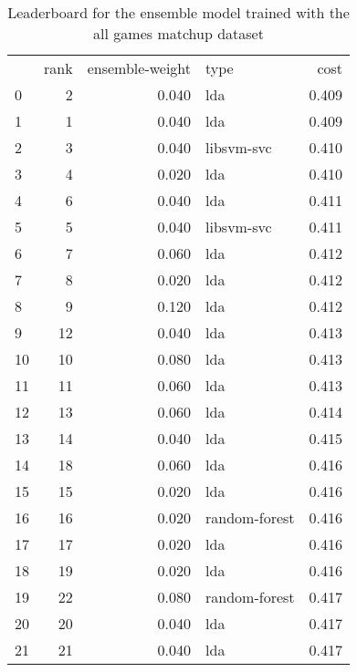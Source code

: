 \begin{table}[]
	\centering
	\begin{tabular}{lrrlr}
		   & rank & ensemble-weight & type          & cost  \\
		0  & 2    & 0.040           & lda           & 0.409 \\
		1  & 1    & 0.040           & lda           & 0.409 \\
		2  & 3    & 0.040           & libsvm-svc    & 0.410 \\
		3  & 4    & 0.020           & lda           & 0.410 \\
		4  & 6    & 0.040           & lda           & 0.411 \\
		5  & 5    & 0.040           & libsvm-svc    & 0.411 \\
		6  & 7    & 0.060           & lda           & 0.412 \\
		7  & 8    & 0.020           & lda           & 0.412 \\
		8  & 9    & 0.120           & lda           & 0.412 \\
		9  & 12   & 0.040           & lda           & 0.413 \\
		10 & 10   & 0.080           & lda           & 0.413 \\
		11 & 11   & 0.060           & lda           & 0.413 \\
		12 & 13   & 0.060           & lda           & 0.414 \\
		13 & 14   & 0.040           & lda           & 0.415 \\
		14 & 18   & 0.060           & lda           & 0.416 \\
		15 & 15   & 0.020           & lda           & 0.416 \\
		16 & 16   & 0.020           & random-forest & 0.416 \\
		17 & 17   & 0.020           & lda           & 0.416 \\
		18 & 19   & 0.020           & lda           & 0.416 \\
		19 & 22   & 0.080           & random-forest & 0.417 \\
		20 & 20   & 0.040           & lda           & 0.417 \\
		21 & 21   & 0.040           & lda           & 0.417 \\
	\end{tabular}

	\caption{Leaderboard for the ensemble model trained with the all games matchup dataset}
	\label{tab:lb-all-games-matchups}
\end{table}

